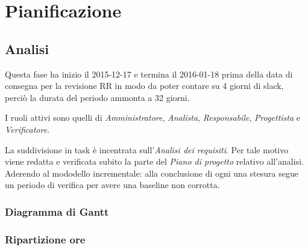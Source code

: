 \section{Pianificazione}
\subsection{Analisi}
Questa fase ha inizio il 2015-12-17 e termina il 2016-01-18 prima della data di consegna per la revisione RR in modo da poter contare su 4 giorni di slack, perci\`o la durata del periodo ammonta a 32 giorni.

I ruoli attivi sono quelli di \textit{Amministratore}, \textit{Analista}, \textit{Responsabile}, \textit{Progettista} e \textit{Verificatore}.

La suddivisione in task \`e incentrata sull'\textit{Analisi dei requisiti}. Per tale motivo viene redatta e verificata subito la parte del \textit{Piano di progetto} relativo all'analisi. Aderendo al mododello incrementale: alla conclusione di ogni una stesura segue un periodo di verifica per avere una baseline non corrotta.
\subsubsection{Diagramma di Gantt}

\subsubsection{Ripartizione ore}

